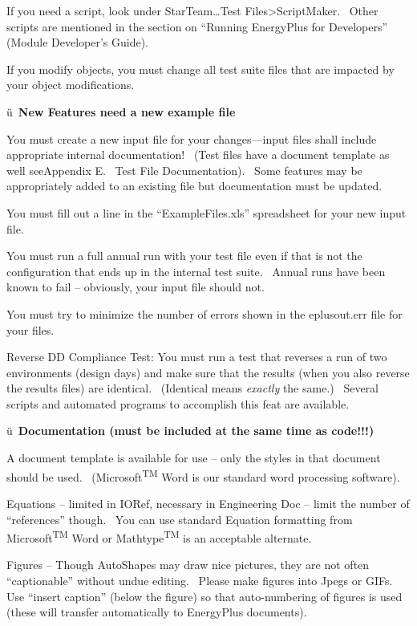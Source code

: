 If you need a script, look under StarTeam\ldots{}Test Files\textgreater{}ScriptMaker.~ Other scripts are mentioned in the section on ``Running EnergyPlus for Developers'' (Module Developer's Guide).

If you modify objects, you must change all test suite files that are impacted by your object modifications.

ü~\textbf{New Features need a new example file}

You must create a new input file for your changes---input files shall include appropriate internal documentation!~ (Test files have a document template as well seeAppendix E.~ Test File Documentation).~ Some features may be appropriately added to an existing file but documentation must be updated.

You must fill out a line in the ``ExampleFiles.xls'' spreadsheet for your new input file.

You must run a full annual run with your test file even if that is not the configuration that ends up in the internal test suite.~ Annual runs have been known to fail -- obviously, your input file should not.

You must try to minimize the number of errors shown in the eplusout.err file for your files.

Reverse DD Compliance Test: You must run a test that reverses a run of two environments (design days) and make sure that the results (when you also reverse the results files) are identical.~ (Identical means \emph{exactly} the same.)~ Several scripts and automated programs to accomplish this feat are available.

ü~\textbf{Documentation (must be included at the same time as code!!!)}

A document template is available for use -- only the styles in that document should be used.~ (Microsoft\textsuperscript{TM} Word is our standard word processing software).

Equations -- limited in IORef, necessary in Engineering Doc -- limit the number of ``references'' though.~ You can use standard Equation formatting from Microsoft\textsuperscript{TM} Word or Mathtype\textsuperscript{TM} is an acceptable alternate.

Figures -- Though AutoShapes may draw nice pictures, they are not often ``captionable'' without undue editing.~ Please make figures into Jpegs or GIFs.~ Use ``insert caption'' (below the figure) so that auto-numbering of figures is used (these will transfer automatically to EnergyPlus documents).

